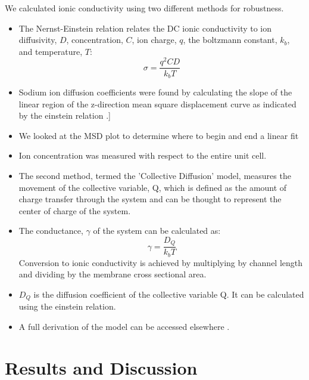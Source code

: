 \documentclass{article}
\begin{document}
  We calculated ionic conductivity using two different methods for robustness.
  \begin{itemize}
    \item The Nernst-Einstein relation relates the DC ionic conductivity to 
    ion diffusivity, $D$, concentration, $C$, ion charge, $q$, the boltzmann 
    constant, $k_b$, and temperature, $T$: $$\sigma = \dfrac{q^2CD}{k_b T}$$  %
    \item Sodium ion diffusion coefficients were found by calculating the slope
    of the linear region of the z-direction mean square displacement curve as indicated by
    the einstein relation \cite{einstein_investigations_1956}.]
    \item We looked at the MSD plot to determine where to begin and end a linear fit
    \item Ion concentration was measured with respect to the entire unit cell. 
    \item The second method, termed the 'Collective Diffusion' model, measures 
    the movement of the collective variable, Q, which is defined as the amount
    of charge transfer through the system and can be thought to represent
    the center of charge of the system.
    \item The conductance, $\gamma$ of the system can be calculated as:
    $$ \gamma = \dfrac{D_Q}{k_b T} $$ Conversion to ionic conductivity is
    achieved by multiplying by channel length and dividing by the membrane
    cross sectional area.
    \item $D_Q$ is the diffusion coefficient of the collective variable Q. It can
    be calculated using the einstein relation.
    \item A full derivation of the model can be accessed elsewhere \cite{liu_collective_2013}.
  \end{itemize}
    
  \section*{Results and Discussion}
  
  
\end{document}
